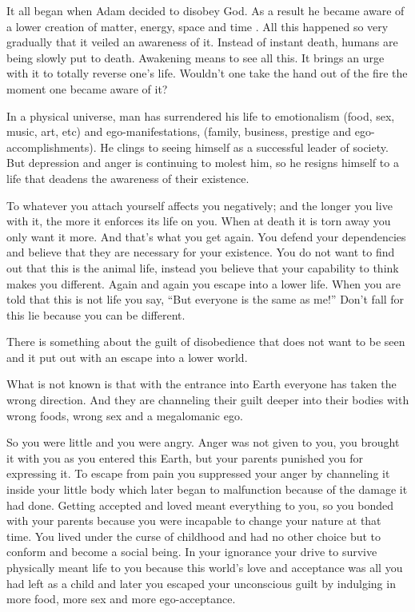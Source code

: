 \documentclass[12pt,letterpaper]{article}
\newcommand{\mest}{matter, energy, space and time }
\begin{document}
It all began when Adam decided to disobey God. As a result he became
aware of a lower creation of \mest. All this happened so very
gradually that it veiled an awareness of it. Instead of instant death,
humans are being slowly put to death. Awakening means to see all
this. It brings an urge with it to totally reverse one's
life. Wouldn't one take the hand out of the fire the moment one became
aware of it?

In a physical universe, man has surrendered his life to emotionalism
(food, sex, music, art, etc) and ego-manifestations, (family,
business, prestige and ego-accomplishments). He clings to seeing
himself as a successful leader of society. But depression and anger is
continuing to molest him, so he resigns himself to a life that deadens
the awareness of their existence.

To whatever you attach yourself affects you negatively; and the longer
you live with it, the more it enforces its life on you. When at death
it is torn away you only want it more. And that's what you get
again. You defend your dependencies and believe that they are
necessary for your existence. You do not want to find out that this is
the animal life, instead you believe that your capability to think
makes you different. Again and again you escape into a lower
life. When you are told that this is not life you say, ``But everyone
is the same as me!'' Don't fall for this lie because you can be
different.

There is something about the guilt of disobedience that does not want
to be seen and it put out with an escape into a lower world.

What is not known is that with the entrance into Earth everyone has
taken the wrong direction. And they are channeling their guilt deeper
into their bodies with wrong foods, wrong sex and a megalomanic ego.

So you were little and you were angry. Anger was not given to you, you
brought it with you as you entered this Earth, but your parents
punished you for expressing it. To escape from pain you suppressed
your anger by channeling it inside your little body which later began
to malfunction because of the damage it had done. Getting accepted and
loved meant everything to you, so you bonded with your parents because
you were incapable to change your nature at that time. You lived under
the curse of childhood and had no other choice but to conform and
become a social being. In your ignorance your drive to survive
physically meant life to you because this world's love and acceptance
was all you had left as a child and later you escaped your unconscious
guilt by indulging in more food, more sex and more ego-acceptance.
\end{document}
